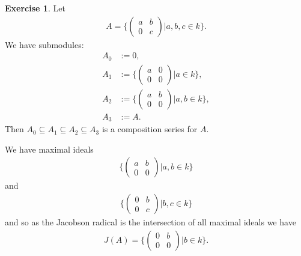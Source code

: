 \documentclass[12pt]{extarticle}
\newcommand{\set}[1]{\{#1\}}
\newcommand{\<}{\langle}
\renewcommand{\>}{\rangle}
\theoremstyle{definition}
\newtheorem{exercise}{Exercise}
\begin{document}
\begin{exercise}
  Let
  \begin{align*}
    A = \set{
      \begin{pmatrix}
        a & b \\
        0 & c 
      \end{pmatrix}
      |
      a,b,c \in k}.
  \end{align*}
  We have submodules:
  \begin{align*}
    A_0 &:= 0, \\
    A_1 &:= \set{
    \begin{pmatrix}
      a & 0 \\
      0 & 0
    \end{pmatrix}
    |
    a \in k
    }, \\
    A_2 &:= \set{
      \begin{pmatrix}
        a & b \\
        0 & 0
      \end{pmatrix}
      |
      a,b \in k
    }, \\
    A_3 &:= A.
  \end{align*}
  Then $A_0 \subseteq A_1 \subseteq A_2 \subseteq A_3$ is a composition series for $A$.

  We have maximal ideals
  \begin{align*}
    \set{
      \begin{pmatrix}
        a & b \\
        0 & 0
      \end{pmatrix}
      |
      a,b \in k
      }
  \end{align*}
  and
  \begin{align*}
    \set{
    \begin{pmatrix}
        0 & b \\
        0 & c
    \end{pmatrix}
    |
    b,c \in k
    }
  \end{align*}
  and so as the Jacobson radical is the intersection of all maximal ideals we have
  \begin{align*}
    J(A) =
    \set{
    \begin{pmatrix}
      0 & b \\
      0 & 0
    \end{pmatrix}
    |
    b \in k
    }.
  \end{align*}
\end{exercise}
\end{document}
